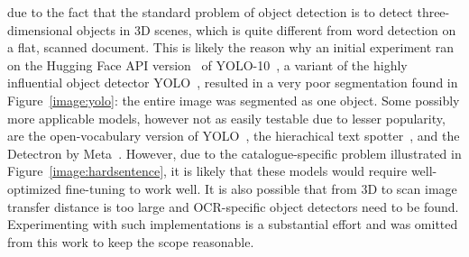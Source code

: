\documentclass{article}
\begin{document}
due to the fact that the standard problem of object detection is to detect three-dimensional objects in 3D scenes, which is 
quite different from word detection on a flat, scanned document. This is likely the reason why an initial experiment 
ran on the Hugging Face API version~\cite{OmouredYOLOv10DocumentLayoutAnalysisHugging2023} of YOLO-10~\cite{wang2024yolov10}, a variant of the highly influential object detector YOLO~\cite{redmonYouOnlyLook2016},
resulted in a very poor segmentation found in Figure~\ref{image:yolo}: the entire image was segmented as one object.
Some possibly more applicable models, however not as easily testable due to lesser popularity, 
are the open-vocabulary version of YOLO~\cite{YOLOWorldRealTimeOpenVocabulary},
 the hierachical text spotter~\cite{longHierarchicalTextSpotter2024}, and the Detectron by Meta~\cite{Detectron}.
 However, due to the catalogue-specific problem illustrated in Figure~\ref{image:hardsentence}, it is likely that these 
 models would require well-optimized fine-tuning to work well. It is also possible that from 3D to scan image transfer distance is 
 too large and OCR-specific object detectors need to be found. Experimenting with such implementations is a 
 substantial effort and was omitted from this work to keep the scope reasonable.
\end{document}
